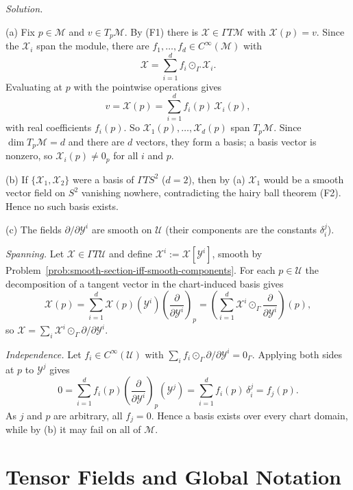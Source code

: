 \documentclass[11pt]{article}
\newcommand{\TpM}{T_p\mathcal M}
\newcommand{\Cinf}{C^\infty(\mathcal M)}
\begin{document}
\medskip
\noindent\textit{Solution.}

(a) Fix $p\in\mathcal M$ and $v\in\TpM$. By (F1) there is $\mathcal
X\in\Gamma T\mathcal M$ with $\mathcal X(p)=v$. Since the $\mathcal X_i$
span the module, there are $f_1,\dots,f_d\in\Cinf$ with
\[
\mathcal X=\sum_{i=1}^d f_i\odot_\Gamma\mathcal X_i.
\]
Evaluating at $p$ with the pointwise operations gives
\[
v=\mathcal X(p)=\sum_{i=1}^d f_i(p)\,\mathcal X_i(p),
\]
with real coefficients $f_i(p)$. So $\mathcal X_1(p),\dots,\mathcal X_d(p)$
span $\TpM$. Since $\dim\TpM=d$ and there are $d$ vectors, they form a
basis; a basis vector is nonzero, so $\mathcal X_i(p)\neq0_p$ for all
$i$ and $p$.

(b) If $\{\mathcal X_1,\mathcal X_2\}$ were a basis of $\Gamma TS^2$ ($d=2$),
then by (a) $\mathcal X_1$ would be a smooth vector field on $S^2$ vanishing
nowhere, contradicting the hairy ball theorem (F2). Hence no such basis
exists.

(c) The fields $\partial/\partial\mathcal Y^i$ are smooth on $\mathcal U$
(their components are the constants $\delta^j_i$).

\emph{Spanning.} Let $\mathcal X\in\Gamma T\mathcal U$ and define
$\mathcal X^i:=\mathcal X[\mathcal Y^i]$, smooth by
Problem~\ref{prob:smooth-section-iff-smooth-components}. For each
$p\in\mathcal U$ the decomposition of a tangent vector in the chart-induced
basis gives
\[
\mathcal X(p)=\sum_{i=1}^d\mathcal X(p)(\mathcal Y^i)\left(\frac{\partial}{\partial\mathcal Y^i}\right)_p=\left(\sum_{i=1}^d\mathcal X^i\odot_\Gamma\frac{\partial}{\partial\mathcal Y^i}\right)(p),
\]
so $\mathcal X=\sum_i\mathcal X^i\odot_\Gamma\partial/\partial\mathcal Y^i$.

\emph{Independence.} Let $f_i\in C^\infty(\mathcal U)$ with
$\sum_i f_i\odot_\Gamma\partial/\partial\mathcal Y^i=0_\Gamma$. Applying
both sides at $p$ to $\mathcal Y^j$ gives
\[
0=\sum_{i=1}^d f_i(p)\left(\frac{\partial}{\partial\mathcal Y^i}\right)_p(\mathcal Y^j)=\sum_{i=1}^d f_i(p)\,\delta^j_i=f_j(p).
\]
As $j$ and $p$ are arbitrary, all $f_j=0$. Hence a basis exists over every
chart domain, while by (b) it may fail on all of $\mathcal M$.

\section{Tensor Fields and Global Notation}
\end{document}
